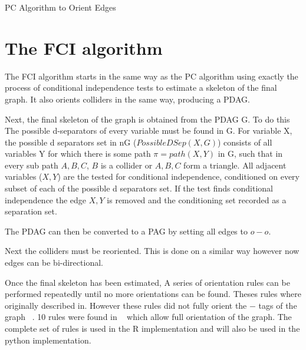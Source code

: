 \documentclass{UoYCSproject}
\begin{document}
\begin{algorithm}[H]
	\DontPrintSemicolon
	
	
	\caption{PC Algorithm to Orient Edges}
\end{algorithm}

\section{The FCI algorithm}

The FCI algorithm starts in the same way as the PC algorithm using exactly the process of conditional independence tests to estimate a skeleton of the final graph. It also orients colliders in the same way, producing a PDAG.

Next, the final skeleton of the graph is obtained from the PDAG G. To do this The possible d-separators of every variable must be found in G. For variable X, the possible d separators set in nG ($PossibleDSep(X,G)$) consists of all variables Y for which there is some path $\pi = path(X,Y)$ in G, such that in every sub path $A,B,C$, $B$ is a collider or $A,B,C$ form a triangle. All adjacent variables ($X,Y$) are the tested for conditional independence, conditioned on every subset of each of the possible d separators set. If the test finds conditional independence the edge $X,Y$ is removed and the conditioning set recorded as a separation set. 

The PDAG can then be converted to a PAG by setting all edges to $o-o$.

Next the colliders must be reoriented. This is done on a similar way however now edges can be bi-directional.

Once the final skeleton has been estimated, A series of orientation rules can be performed repeatedly until no more orientations can be found. Theses rules where originally described in. However these rules did not fully orient the $-$ tags of the graph ~\parencite{ZHANG20081873}. 10 rules were found in ~\parencite{ZHANG20081873} which allow full orientation of the graph. The complete set of rules is used in the R implementation and will also be used in the python implementation.
\end{document}
